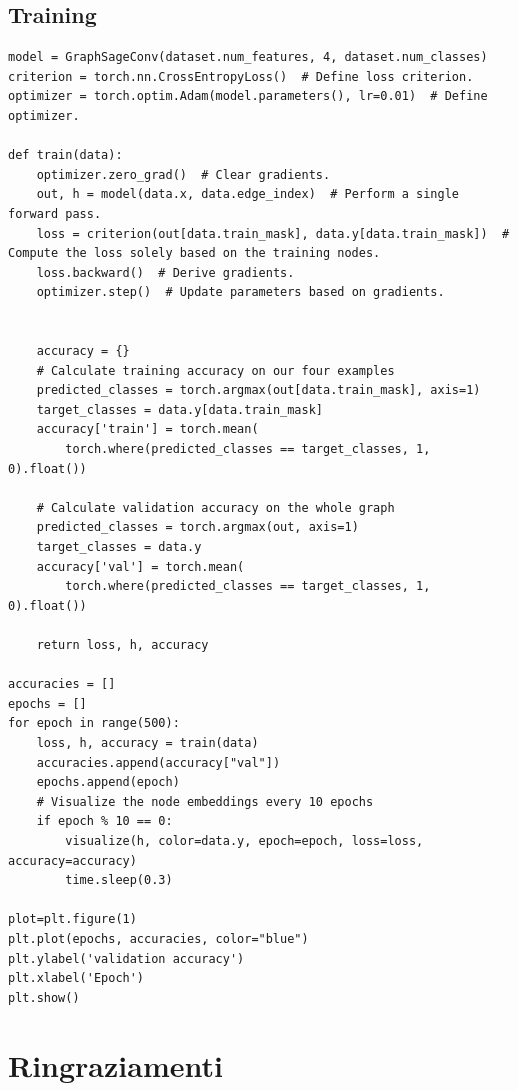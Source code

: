 \documentclass[12pt,a4paper]{report}
\theoremstyle{definition}
\begin{document}
\section{Training}
\label{sec:training}

\begin{lstlisting}
model = GraphSageConv(dataset.num_features, 4, dataset.num_classes)
criterion = torch.nn.CrossEntropyLoss()  # Define loss criterion.
optimizer = torch.optim.Adam(model.parameters(), lr=0.01)  # Define optimizer.

def train(data):
    optimizer.zero_grad()  # Clear gradients.
    out, h = model(data.x, data.edge_index)  # Perform a single forward pass.
    loss = criterion(out[data.train_mask], data.y[data.train_mask])  # Compute the loss solely based on the training nodes.
    loss.backward()  # Derive gradients.
    optimizer.step()  # Update parameters based on gradients.


    accuracy = {}
    # Calculate training accuracy on our four examples
    predicted_classes = torch.argmax(out[data.train_mask], axis=1)
    target_classes = data.y[data.train_mask]
    accuracy['train'] = torch.mean(
        torch.where(predicted_classes == target_classes, 1, 0).float())
    
    # Calculate validation accuracy on the whole graph
    predicted_classes = torch.argmax(out, axis=1)
    target_classes = data.y
    accuracy['val'] = torch.mean(
        torch.where(predicted_classes == target_classes, 1, 0).float())

    return loss, h, accuracy

accuracies = []
epochs = []
for epoch in range(500):
    loss, h, accuracy = train(data)
    accuracies.append(accuracy["val"])
    epochs.append(epoch)
    # Visualize the node embeddings every 10 epochs
    if epoch % 10 == 0:
        visualize(h, color=data.y, epoch=epoch, loss=loss, accuracy=accuracy)
        time.sleep(0.3)
        
plot=plt.figure(1)
plt.plot(epochs, accuracies, color="blue")
plt.ylabel('validation accuracy')
plt.xlabel('Epoch')
plt.show()
\end{lstlisting}


\printbibliography[heading=bibintoc]

\chapter*{Ringraziamenti}
\end{document}

